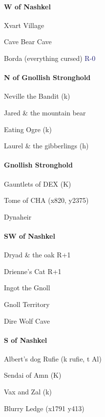 \documentclass[10pt,a4,twoside]{book}
\begin{document}
\begin{multicols}{3}
\paragraph*{W of Nashkel}
\begin{trivlist}
\item Xvart Village
\item Cave Bear Cave
\item Borda (everything cursed) \textcolor{MidnightBlue}{R-0}
\end{trivlist}

\paragraph*{N of Gnollish Stronghold}
\begin{trivlist}
\item Neville the Bandit (k)
\item Jared \& the mountain bear
\item Eating Ogre (k)
\item Laurel \& the gibberlings (h)
\end{trivlist}

\paragraph*{Gnollish Stronghold}
\begin{trivlist}
\item Gauntlets of DEX (K)
\item Tome of CHA (x820, y2375)
\item Dynaheir
\end{trivlist}

\paragraph*{SW of Nashkel}
\begin{trivlist}
\item Dryad \& the oak {\textcolor{OliveGreen}{R+1}}
\item Drienne's Cat {\textcolor{OliveGreen}{R+1}}
\item Ingot the Gnoll
\item Gnoll Territory
\item Dire Wolf Cave
\end{trivlist}

\paragraph*{S of Nashkel}
\begin{trivlist}
\item Albert's dog Rufie (k rufie, t Al)
\item Sendai of Amn (K) %
\item Vax and Zal (k)
\item Blurry Ledge (x1791 y413)
\end{trivlist}


\end{multicols}
\end{document}
